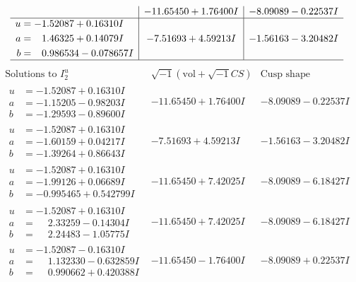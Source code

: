 \documentclass[1p]{elsarticle_modified}
\theoremstyle{definition}
\newcommand{\I}{\sqrt{-1}}
\begin{document}
$$\begin{array}{c|c|c}
 & -11.65450 + 1.76400 I & -8.09089 - 0.22537 I \\ \hline\begin{aligned}
u &= -1.52087 + 0.16310 I \\
a &= \phantom{-}1.46325 + 0.14079 I \\
b &= \phantom{-}0.986534 - 0.078657 I\end{aligned}
 & -7.51693 + 4.59213 I & -1.56163 - 3.20482 I\\
 \hline 
 \end{array}$$\newpage$$\begin{array}{c|c|c}  
\text{Solutions to }I^u_{2}& \I (\text{vol} + \sqrt{-1}CS) & \text{Cusp shape}\\
 \hline 
\begin{aligned}
u &= -1.52087 + 0.16310 I \\
a &= -1.15205 - 0.98203 I \\
b &= -1.29593 - 0.89600 I\end{aligned}
 & -11.65450 + 1.76400 I & -8.09089 - 0.22537 I \\ \hline\begin{aligned}
u &= -1.52087 + 0.16310 I \\
a &= -1.60159 + 0.04217 I \\
b &= -1.39264 + 0.86643 I\end{aligned}
 & -7.51693 + 4.59213 I & -1.56163 - 3.20482 I \\ \hline\begin{aligned}
u &= -1.52087 + 0.16310 I \\
a &= -1.99126 + 0.06689 I \\
b &= -0.995465 + 0.542799 I\end{aligned}
 & -11.65450 + 7.42025 I & -8.09089 - 6.18427 I \\ \hline\begin{aligned}
u &= -1.52087 + 0.16310 I \\
a &= \phantom{-}2.33259 - 0.14304 I \\
b &= \phantom{-}2.24483 - 1.05775 I\end{aligned}
 & -11.65450 + 7.42025 I & -8.09089 - 6.18427 I \\ \hline\begin{aligned}
u &= -1.52087 - 0.16310 I \\
a &= \phantom{-}1.132330 - 0.632859 I \\
b &= \phantom{-}0.990662 + 0.420388 I\end{aligned}
 & -11.65450 - 1.76400 I & -8.09089 + 0.22537 I \\ \hline\begin{aligned}

\end{aligned}
\end{array}$$
\end{document}
